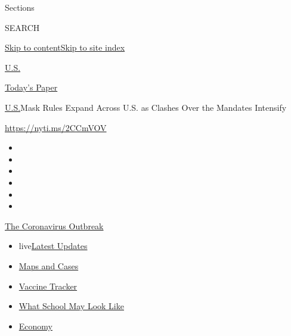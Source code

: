 Sections

SEARCH

\protect\hyperlink{site-content}{Skip to
content}\protect\hyperlink{site-index}{Skip to site index}

\href{https://www.nytimes.com/section/us}{U.S.}

\href{https://myaccount.nytimes.com/auth/login?response_type=cookie\&client_id=vi}{}

\href{https://www.nytimes.com/section/todayspaper}{Today's Paper}

\href{/section/us}{U.S.}\textbar{}Mask Rules Expand Across U.S. as
Clashes Over the Mandates Intensify

\url{https://nyti.ms/2CCmVOV}

\begin{itemize}
\item
\item
\item
\item
\item
\item
\end{itemize}

\href{https://www.nytimes.com/news-event/coronavirus?action=click\&pgtype=Article\&state=default\&region=TOP_BANNER\&context=storylines_menu}{The
Coronavirus Outbreak}

\begin{itemize}
\tightlist
\item
  live\href{https://www.nytimes.com/2020/08/01/world/coronavirus-covid-19.html?action=click\&pgtype=Article\&state=default\&region=TOP_BANNER\&context=storylines_menu}{Latest
  Updates}
\item
  \href{https://www.nytimes.com/interactive/2020/us/coronavirus-us-cases.html?action=click\&pgtype=Article\&state=default\&region=TOP_BANNER\&context=storylines_menu}{Maps
  and Cases}
\item
  \href{https://www.nytimes.com/interactive/2020/science/coronavirus-vaccine-tracker.html?action=click\&pgtype=Article\&state=default\&region=TOP_BANNER\&context=storylines_menu}{Vaccine
  Tracker}
\item
  \href{https://www.nytimes.com/interactive/2020/07/29/us/schools-reopening-coronavirus.html?action=click\&pgtype=Article\&state=default\&region=TOP_BANNER\&context=storylines_menu}{What
  School May Look Like}
\item
  \href{https://www.nytimes.com/live/2020/07/31/business/stock-market-today-coronavirus?action=click\&pgtype=Article\&state=default\&region=TOP_BANNER\&context=storylines_menu}{Economy}
\end{itemize}

